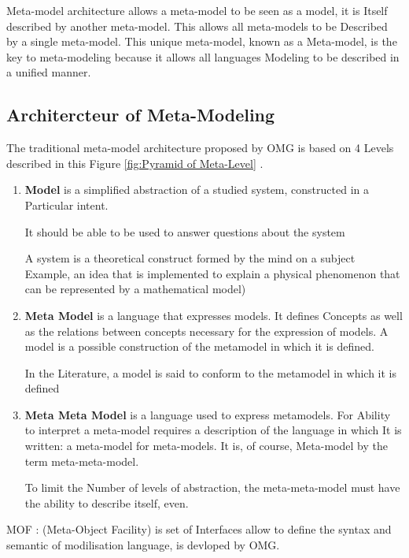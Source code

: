 Meta-model architecture allows a meta-model to be seen as a model, it is
Itself described by another meta-model. This allows all meta-models to be
Described by a single meta-model. This unique meta-model, known as a
Meta-model, is the key to meta-modeling because it allows all languages
Modeling to be described in a unified manner.


\subsection{Architercteur of Meta-Modeling}
The traditional meta-model architecture proposed by OMG is based on 4 Levels
described in this Figure \ref{fig:Pyramid of Meta-Level} \cite{ch3-doc, ch3-mml} .

\begin{enumerate}
\item \textbf{Model} is a simplified abstraction of a studied system, constructed in a
Particular intent. 

It should be able to be used to answer questions about the system

A system is a theoretical construct formed by the mind on a subject
Example, an idea that is implemented to explain a physical phenomenon that can
be represented by a mathematical model) 

\item \textbf{Meta Model} is a language that expresses models. It defines
Concepts as well as the relations between concepts necessary for the expression of models. 
A model is a possible construction of the metamodel in which it is defined.

In the Literature, a model is said to conform to the metamodel in which it is defined

\item \textbf{Meta Meta Model} is a language used to express metamodels. 
For Ability to interpret a meta-model requires a description of the language in which
It is written: a meta-model for meta-models. 
It is, of course, Meta-model by the term meta-meta-model. 

To limit the Number of levels of abstraction, the meta-meta-model 
must have the ability to describe itself, even. 
 

\end{enumerate}

MOF : (Meta-Object Facility) is set of Interfaces allow to define 
the syntax and semantic of modilisation language, is devloped by OMG\cite{ch3-doc, ch3-doc}.

